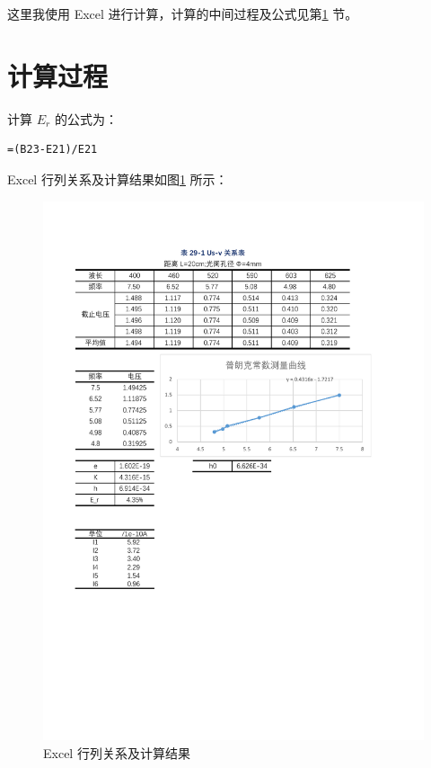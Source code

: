 \documentclass[12pt]{article}
\begin{document}
这里我使用 Excel 进行计算，计算的中间过程及公式见第\ref{sec:calculation_process} 节。

\section{\normalfont 计算过程}
\label{sec:calculation_process}





计算 $E_r$ 的公式为：
\begin{Verbatim}[frame=single, fontsize=\small]
    =(B23-E21)/E21
\end{Verbatim}

Excel 行列关系及计算结果如图\ref{fig:final_table} 所示：
\begin{figure}[H] %
    \centering
    \includegraphics[width=\textwidth]{./figures/佐证材料.pdf} 
    \caption{Excel 行列关系及计算结果}
    \label{fig:final_table}
\end{figure}
\end{document}

